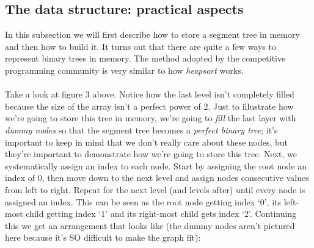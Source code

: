 \documentclass[11pt]{article}
\theoremstyle{plain}
\theoremstyle{definition}
\begin{document}
\subsection{The data structure: practical aspects}
In this subsection we will first describe how to store a segment tree in memory and then how to build it. It turns out that there are quite a few ways to represent binary trees in memory. The method adopted by the competitive programming community is very similar to how \emph{heapsort} works.\\\\
Take a look at figure 3 above. Notice how the last level isn't completely filled because the size of the array isn't a perfect power of 2. Just to illustrate how we're going to store this tree in memory, we're going to \emph{fill} the last layer with \emph{dummy nodes} so that the segment tree becomes a \emph{perfect binary tree}; it's important to keep in mind that we don't really care about these nodes, but they're important to demonstrate how we're going to store this tree. Next, we systematically assign an index to each node. Start by assigning the root node an index of 0, then move down to the next level and assign nodes consecutive values from left to right. Repeat for the next level (and levels after) until every node is assigned an index. This can be seen as the root node getting index `0', its left-most child getting index `1' and its right-most child gets index `2'. Continuing this we get an arrangement that looks like (the dummy nodes aren't pictured here because it's SO difficult to make the graph fit):
\end{document}
